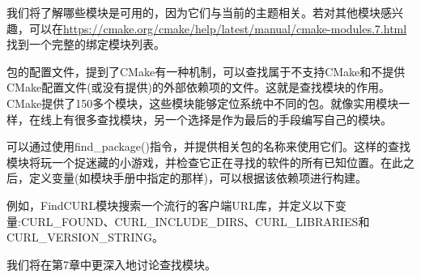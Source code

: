 我们将了解哪些模块是可用的，因为它们与当前的主题相关。若对其他模块感兴趣，可以在\url{https://cmake.org/cmake/help/latest/manual/cmake-modules.7.html}找到一个完整的绑定模块列表。


包的配置文件，提到了CMake有一种机制，可以查找属于不支持CMake和不提供CMake配置文件(或没有提供)的外部依赖项的文件。这就是查找模块的作用。CMake提供了150多个模块，这些模块能够定位系统中不同的包。就像实用模块一样，在线上有很多查找模块，另一个选择是作为最后的手段编写自己的模块。

可以通过使用find\_package()指令，并提供相关包的名称来使用它们。这样的查找模块将玩一个捉迷藏的小游戏，并检查它正在寻找的软件的所有已知位置。在此之后，定义变量(如模块手册中指定的那样)，可以根据该依赖项进行构建。

例如，FindCURL模块搜索一个流行的客户端URL库，并定义以下变量:CURL\_FOUND、CURL\_INCLUDE\_DIRS、CURL\_LIBRARIES和CURL\_VERSION\_STRING。

我们将在第7章中更深入地讨论查找模块。








